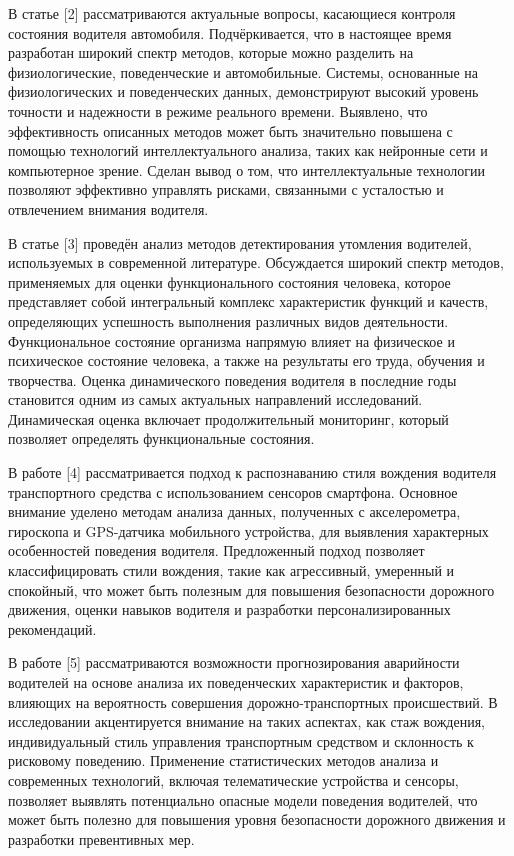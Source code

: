 \begin{multicols}{2}
В статье {[}2{]} рассматриваются актуальные вопросы, касающиеся контроля
состояния водителя автомобиля. Подчёркивается, что в настоящее время
разработан широкий спектр методов, которые можно разделить на
физиологические, поведенческие и автомобильные. Системы, основанные на
физиологических и поведенческих данных, демонстрируют высокий уровень
точности и надежности в режиме реального времени. Выявлено, что
эффективность описанных методов может быть значительно повышена с
помощью технологий интеллектуального анализа, таких как нейронные сети и
компьютерное зрение. Сделан вывод о том, что интеллектуальные технологии
позволяют эффективно управлять рисками, связанными с усталостью и
отвлечением внимания водителя.

В статье {[}3{]} проведён анализ методов детектирования утомления
водителей, используемых в современной литературе. Обсуждается широкий
спектр методов, применяемых для оценки функционального состояния
человека, которое представляет собой интегральный комплекс характеристик
функций и качеств, определяющих успешность выполнения различных видов
деятельности. Функциональное состояние организма напрямую влияет на
физическое и психическое состояние человека, а также на результаты его
труда, обучения и творчества. Оценка динамического поведения водителя в
последние годы становится одним из самых актуальных направлений
исследований. Динамическая оценка включает продолжительный мониторинг,
который позволяет определять функциональные состояния.

В работе {[}4{]} рассматривается подход к распознаванию стиля вождения
водителя транспортного средства с использованием сенсоров смартфона.
Основное внимание уделено методам анализа данных, полученных с
акселерометра, гироскопа и GPS-датчика мобильного устройства, для
выявления характерных особенностей поведения водителя. Предложенный
подход позволяет классифицировать стили вождения, такие как агрессивный,
умеренный и спокойный, что может быть полезным для повышения
безопасности дорожного движения, оценки навыков водителя и разработки
персонализированных рекомендаций.

В работе {[}5{]} рассматриваются возможности прогнозирования аварийности
водителей на основе анализа их поведенческих характеристик и факторов,
влияющих на вероятность совершения дорожно-транспортных происшествий. В
исследовании акцентируется внимание на таких аспектах, как стаж
вождения, индивидуальный стиль управления транспортным средством и
склонность к рисковому поведению. Применение статистических методов
анализа и современных технологий, включая телематические устройства и
сенсоры, позволяет выявлять потенциально опасные модели поведения
водителей, что может быть полезно для повышения уровня безопасности
дорожного движения и разработки превентивных мер.


\end{multicols}
